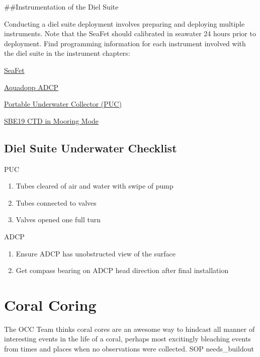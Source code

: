 \documentclass[
]{book}
\providecommand{\tightlist}{%
  \setlength{\itemsep}{0pt}\setlength{\parskip}{0pt}}
\begin{document}
\#\#Instrumentation of the Diel Suite

Conducting a diel suite deployment involves preparing and deploying multiple instruments. Note that the SeaFet should calibrated in seawater 24 hours prior to deployment. Find programming information for each instrument involved with the diel suite in the instrument chapters:

\protect\hyperlink{seafet}{SeaFet}

\protect\hyperlink{adcp}{Aquadopp ADCP}

\protect\hyperlink{puc}{Portable Underwater Collector (PUC)}

\protect\hyperlink{moored_ctd}{SBE19 CTD in Mooring Mode}

\hypertarget{diel-suite-underwater-checklist}{%
\section{Diel Suite Underwater Checklist}\label{diel-suite-underwater-checklist}}

PUC

\begin{enumerate}
\def\labelenumi{\arabic{enumi}.}
\tightlist
\item
  Tubes cleared of air and water with swipe of pump
\item
  Tubes connected to valves
\item
  Valves opened one full turn
\end{enumerate}

ADCP

\begin{enumerate}
\def\labelenumi{\arabic{enumi}.}
\tightlist
\item
  Ensure ADCP has unobstructed view of the surface
\item
  Get compass bearing on ADCP head direction after final installation
\end{enumerate}

\hypertarget{coral-coring}{%
\chapter{Coral Coring}\label{coral-coring}}

The OCC Team thinks coral cores are an awesome way to hindcast all manner of interesting events in the life of a coral, perhaps most excitingly bleaching events from times and places when no observations were collected. SOP needs\_buildout
\end{document}
